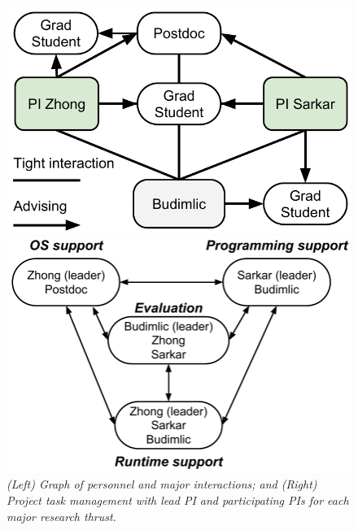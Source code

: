 \begin{figure}
    \centering
    \begin{minipage}[5cm]{0.44\textwidth}
    \centering
 \includegraphics[height=0.17\textheight]{figs/collaboration}
    \end{minipage}
\hspace{+2mm}
    \begin{minipage}[5cm]{0.46\textwidth}    \centering
 \includegraphics[height=0.18\textheight]{figs/taskmanagement}
    \end{minipage}
 \caption{\textit{(\emph{Left}) Graph of personnel and major interactions; and (\emph{Right}) Project task management with lead PI and participating PIs for each major research thrust.}}
    \label{fig:collaboration}
\end{figure}

